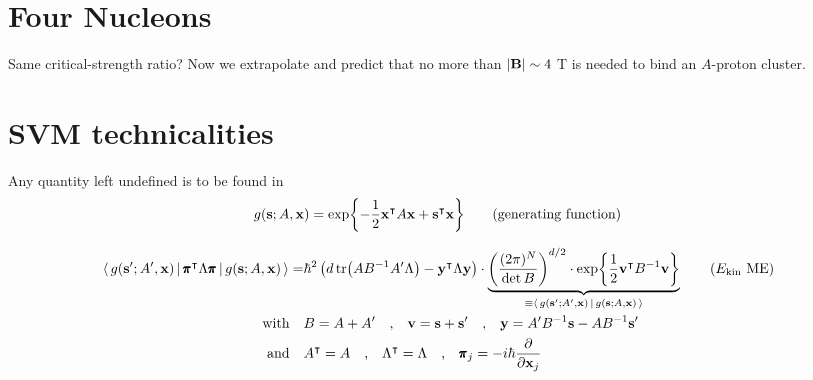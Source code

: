 \documentclass[
reprint,
onecolumn,
nofootinbib,
amsmath,amssymb,
aps,
]{revtex4-2}
\newcommand{\be} {\begin{equation}}
\newcommand{\ee} {\end{equation}}
\begin{document}
\section{Four Nucleons}

Same critical-strength ratio? Now we extrapolate and predict that no more than 
$\vert\vb{B}\vert\sim 4~$T is needed to bind an $A$-proton cluster.

\section{SVM technicalities}
Any quantity left undefined is to be found in~\cite{suzuki2003stochastic}
\be
g(\vb{s};A,\vb{x})=\exp{-\frac{1}{2}\vb{x}^\intercal A\vb{x}+\vb{s}^\intercal\vb{x}}
\tag{generating function}
\ee

\begin{align}
\mel{\,g(\vb{s}';A',\vb{x})\,}{\,\pmb{\pi}^\intercal\Lambda\pmb{\pi}\,}{\,g(\vb{s};A,\vb{x})\,}
=&
\hbar^2\left(d\tr(AB^{-1}A'\Lambda)-\vb{y}^\intercal\Lambda\vb{y}\right)\cdot
\underbrace{\left(\frac{(2\pi)^N}{\det B}\right)^{d/2}\cdot\exp{\frac{1}{2}\vb{v}^\intercal B^{-1}\vb{v}}}_{\equiv\braket{\,g(\vb{s}';A',\vb{x})\,}{\,g(\vb{s};A,\vb{x})\,}}
\tag{$E_{\text{kin}}$ ME}\\
\qq{with} &  B=A+A'\qq{,} \vb{v} = \vb{s} + \vb{s}' \qq{,} \vb{y} = A'B^{-1}\vb{s}-AB^{-1}\vb{s}'\\
\qq{and}  &  A^\intercal=A \qq{,} \Lambda^\intercal=\Lambda \qq{,} \pmb{\pi}_j=-i\hbar\pdv{\vb{x}_j}
\end{align}


\end{document}
